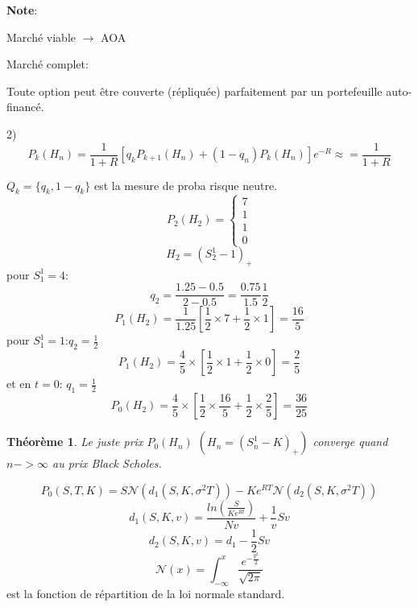 \documentclass{article}
\theoremstyle{plain}
\newtheorem{thm}{Th\'eor\`eme}[section]
\theoremstyle{definition}
\begin{document}
\textbf{Note}:

March\'e viable $\rightarrow$ AOA

March\'e complet:

Toute option peut \^etre couverte (r\'epliqu\'ee) parfaitement par un portefeuille auto-financ\'e. 

2)
\begin{equation}
P_k(H_n)=\frac{1}{1+R}[q_kP_{k+1}(H_n)+(1-q_n)P_{k}(H_n)]e^{-R}\approx=\frac{1}{1+R}
\end{equation}

$Q_k=\{q_k,1-q_k\}$ est la mesure de proba risque neutre.
\begin{equation}
P_2(H_2)=
\left\{\begin{array}{r}
7\\
1\\
1\\
0
\end{array}\right.
\end{equation}
\begin{equation}
H_2=(S_2^1-1)_+
\end{equation}
pour $S_1^1=4$:
\begin{equation}
q_2=\frac{1.25-0.5}{2-0.5}=\frac{0.75}{1.5}\frac{1}{2}
\end{equation}
\begin{equation}
P_1(H_2)=\frac{1}{1.25}[\frac{1}{2}\times 7+\frac{1}{2}\times 1]=\frac{16}{5}
\end{equation}
pour $S_1^1=1$:$q_2=\frac{1}{2}$
\begin{equation}
P_1(H_2)=\frac{4}{5}\times[\frac{1}{2}\times 1+\frac{1}{2}\times 0]=\frac{2}{5}
\end{equation}
et en $t=0$: $q_1=\frac{1}{2}$
\begin{equation}
P_0(H_2)=\frac{4}{5}\times[\frac{1}{2}\times\frac{16}{5}+\frac{1}{2}\times\frac{2}{5}]=\frac{36}{25}
\end{equation}

\begin{thm}
	Le juste prix $P_0(H_n)$ $(H_n=(S_n^1-K)_+)$ converge quand $n->\infty$ au prix Black Scholes.
\end{thm}
\begin{equation}
P_0(S,T,K)=S\mathcal{N}(d_1(S,K,\sigma^2 T))-Ke^{R T}\mathcal{N}(d_2(S,K,\sigma^2 T))
\end{equation}
\begin{equation}
d_1(S,K,v)=\frac{ln(\frac{S}{Ke^{R t}})}{Nv}+\frac{1}{v}Sv
\end{equation}
\begin{equation}
d_2(S,K,v)=d_1-\frac{1}{2}Sv
\end{equation}
\begin{equation}
\mathcal{N}(x)=\int_{-\infty}^x\frac{e^{-\frac{y^2}{2}}}{\sqrt{2\pi}}
\end{equation}
est la fonction de r\'epartition de la loi normale standard.
\end{document}
